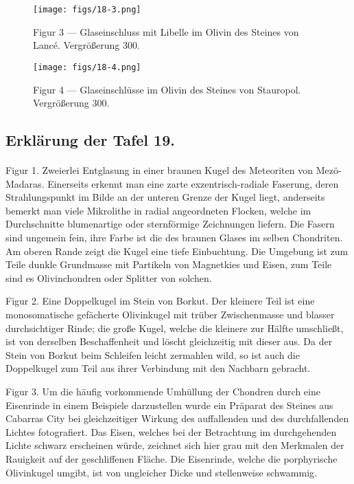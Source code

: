 \documentclass[a4paper, 12pt, oneside]{article}
\begin{document}
\vspace*{\fill}
\begin{figure}[H]
\centering
\texttt{[image: figs/18-3.png]}
\caption{\small Figur 3 --- Glaseinschluss mit Libelle im Olivin des Steines von Lancé. Vergrößerung 300.}
\end{figure}
\vspace*{\fill}
\clearpage

\vspace*{\fill}
\begin{figure}[H]
\centering
\texttt{[image: figs/18-4.png]}
\caption{\small Figur 4 --- Glaseinschlüsse im Olivin des Steines von Stauropol. Vergrößerung 300.}
\end{figure}
\vspace*{\fill}
\clearpage

\subsection{Erklärung der Tafel 19.}
\paragraph{}
Figur 1. Zweierlei Entglasung in einer braunen Kugel des Meteoriten von Mezö-Madaras. Einerseits erkennt man eine zarte exzentrisch-radiale Faserung, deren Strahlungspunkt im Bilde an der unteren Grenze der Kugel liegt, anderseits bemerkt man viele Mikrolithe in radial angeordneten Flocken, welche im Durchschnitte blumenartige oder sternförmige Zeichnungen liefern. Die Fasern sind ungemein fein, ihre Farbe ist die des braunen Glases im selben Chondriten. Am oberen Rande zeigt die Kugel eine tiefe Einbuchtung. Die Umgebung ist zum Teile dunkle Grundmasse mit Partikeln von Magnetkies und Eisen, zum Teile sind es Olivinchondren oder Splitter von solchen.

Figur 2. Eine Doppelkugel im Stein von Borkut. Der kleinere Teil ist eine monosomatische gefächerte Olivinkugel mit trüber Zwischenmasse und blasser durchsichtiger Rinde; die große Kugel, welche die kleinere zur Hälfte umschließt, ist von derselben Beschaffenheit und löscht gleichzeitig mit dieser aus. Da der Stein von Borkut beim Schleifen leicht zermahlen wild, so ist auch die Doppelkugel zum Teil aus ihrer Verbindung mit den Nachbarn gebracht.

Figur 3. Um die häufig vorkommende Umhüllung der Chondren durch eine Eisenrinde in einem Beispiele darzustellen wurde ein Präparat des Steines aus Cabarras City bei gleichzeitiger Wirkung des auffallenden und des durchfallenden Lichtes fotografiert. Das Eisen, welches bei der Betrachtung im durchgehenden Lichte schwarz erscheinen würde, zeichnet sich hier grau mit den Merkmalen der Rauigkeit auf der geschliffenen Fläche. Die Eisenrinde, welche die porphyrische Olivinkugel umgibt, ist von ungleicher Dicke und stellenweise schwammig.
\end{document}
